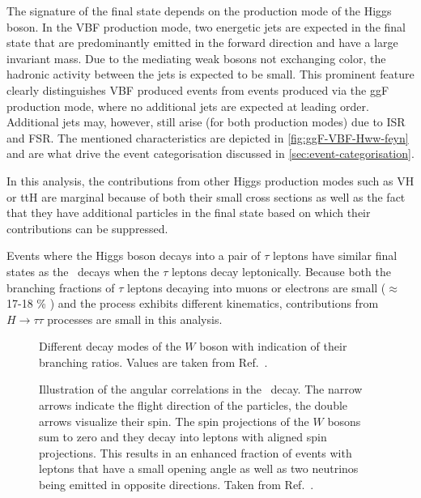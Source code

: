 The signature of the final state depends on the production mode of the Higgs boson.
In the VBF production mode, two energetic jets are expected in the final state that are predominantly emitted in the forward direction and have a large invariant mass. Due to the mediating weak bosons not exchanging color, the hadronic activity between the jets is expected to be small. 
This prominent feature clearly distinguishes VBF produced \HWW events from events produced via the ggF production mode, where no additional jets are expected at leading order. Additional jets may, however, still arise (for both production modes) due to ISR and FSR. The mentioned characteristics are depicted in \cref{fig:ggF-VBF-Hww-feyn} and are what drive the event categorisation discussed in \cref{sec:event-categorisation}. 

In this analysis, the contributions from other Higgs production modes such as VH or ttH are marginal because of both their small cross sections as well as the fact that they have additional particles in the final state based on which their contributions can be suppressed.

Events where the Higgs boson decays into a pair of $\tau$ leptons have similar final states as the \HWWdet\ decays when the $\tau$ leptons decay leptonically. 
Because both the branching fractions of $\tau$ leptons decaying into muons or electrons are small ($\approx$ 17-18 \% \cite{PDG2020}) and the process exhibits different kinematics, contributions from $H \to \tau\tau$ processes are small in this analysis. 


\begin{figure}
    \caption[Different decay modes of the $W$ boson with indication of their branching ratios.]{Different decay modes of the $W$ boson with indication of their branching ratios. Values are taken from Ref.~\cite{PDG2020}.}
    \label{fig:w-branching-ratios}
\end{figure}

\begin{figure}
    \caption[Angular correlations in the \HWWdet\ decay.]{Illustration of the angular correlations in the \HWWdet\ decay. The narrow arrows indicate the flight direction of the particles, the double arrows visualize their spin. The spin projections of the $W$ bosons sum to zero and they decay into leptons with aligned spin projections. This results in an enhanced fraction of events with leptons that have a small opening angle as well as two neutrinos being emitted in opposite directions. Taken from Ref.~\cite{PhysRevD.92.012006}.}
    \label{fig:spin-correlations}
\end{figure}

